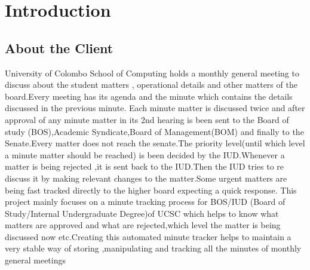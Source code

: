 \documentclass[a4paper,beamer]{article}
\begin{document}
	\renewcommand{\footrulewidth}{0.1pt}
	
	\tableofcontents
	\newpage
	
	\section{Introduction}
	
	\subsection{About the Client}
	University of Colombo School of Computing holds a monthly general meeting to  discuss about the student matters , operational details and other matters of the board.Every meeting has its agenda and the minute which contains the details discussed in the previous minute.\newline
	Each minute matter is discussed twice and after  approval of any minute matter in its 2nd hearing  is been sent to the  Board of study (BOS),Academic Syndicate,Board of Management(BOM) and finally to the Senate.Every matter does not reach the senate.The priority level(until which level a minute matter should be reached) is been decided by the IUD.Whenever a matter is being rejected ,it is sent back to the IUD.Then the IUD tries to re discuss it  by making relevant changes to the matter.Some urgent matters are being fast tracked directly to the higher board expecting a quick response. This project  mainly focuses  on a minute tracking process for BOS/IUD (Board of Study/Internal Undergraduate Degree)of UCSC which helps to know what matters are approved and what are rejected,which level the matter is being discussed now etc.Creating this automated minute tracker  helps to maintain a very stable way of storing ,manipulating and tracking  all the minutes of monthly general meetings
	
\end{document}
